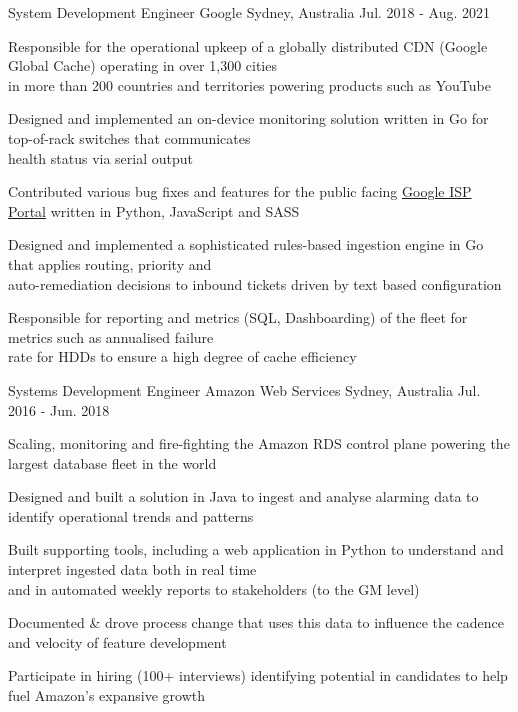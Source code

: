 \begin{cventries}
  \cventry
    {System Development Engineer} %
    {Google} %
    {Sydney, Australia} %
    {Jul. 2018 - Aug. 2021} %
    {
      \begin{cvitems} %
        \item {Responsible for the operational upkeep of a globally distributed CDN (Google Global Cache) operating in over 1,300 cities\\
         in more than 200 countries and territories powering products such as YouTube}
        \item {Designed and implemented an on-device monitoring solution written in Go for top-of-rack switches that communicates\\
         health status via serial output }
        \item {Contributed various bug fixes and features for the public facing \href{https://peering.google.com/}{Google ISP Portal} written in Python, JavaScript and SASS}
        \item {Designed and implemented a sophisticated rules-based ingestion engine in Go that applies routing, priority and\\
         auto-remediation decisions to inbound tickets driven by text based configuration}
        \item {Responsible for reporting and metrics (SQL, Dashboarding) of the fleet for metrics such as annualised failure\\
         rate for HDDs to ensure a high degree of cache efficiency}
      \end{cvitems}
    }


  \cventry
    {Systems Development Engineer} %
    {Amazon Web Services} %
    {Sydney, Australia} %
    {Jul. 2016 - Jun. 2018} %
    {
      \begin{cvitems} %
        \item {Scaling, monitoring and fire-fighting the Amazon RDS control plane powering the largest database fleet in the world}
        \item {Designed and built a solution in Java to ingest and analyse alarming data to identify operational trends and patterns }
        \item {Built supporting tools, including a web application in Python to understand and interpret ingested data both in real time\\
        and in automated weekly reports to stakeholders (to the GM level)}
        \item {Documented \& drove process change that uses this data to influence the cadence and velocity of feature development }
        \item {Participate in hiring (100+ interviews) identifying potential in candidates to help fuel Amazon's expansive growth}
      \end{cvitems}
    }


\end{cventries}
